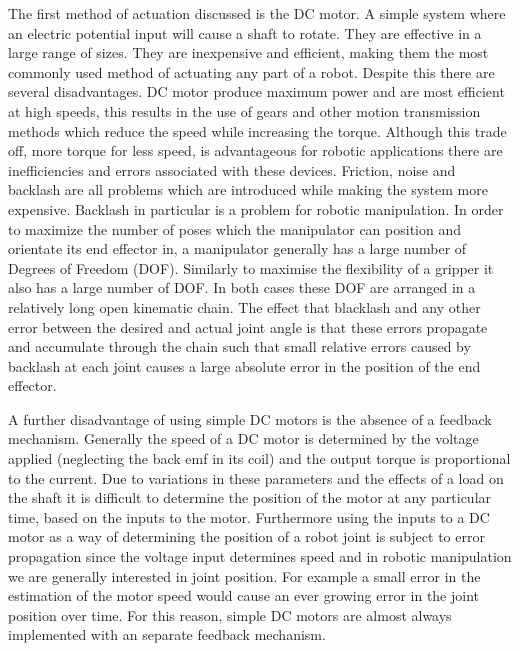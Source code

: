 The first method of actuation discussed is the DC motor. A simple system where an electric potential input will cause a shaft to rotate. They are effective in a large range of sizes. They are inexpensive and efficient, making them the most commonly used method of actuating any part of a robot. Despite this there are several disadvantages. DC motor produce maximum power and are most efficient at high speeds, this results in the use of gears and other motion transmission methods which reduce the speed while increasing the torque. Although this trade off, more torque for less speed, is advantageous for robotic applications there are inefficiencies and errors associated with these devices. Friction, noise and backlash are all problems which are introduced while making the system more expensive. Backlash in particular is a problem for robotic manipulation. In order to maximize the number of poses which the manipulator can position and orientate its end effector in, a manipulator generally has a large number of Degrees of Freedom (DOF). Similarly to maximise the flexibility of a gripper it also has a large number of DOF. In both cases these DOF are arranged in a relatively long open kinematic chain. The effect that blacklash and any other error between the desired and actual joint angle is that these errors propagate and accumulate through the chain such that small relative errors caused by backlash at each joint causes a large absolute error in the position of the end effector.


A further disadvantage of using simple DC motors is the absence of a feedback mechanism. Generally the speed of a DC motor is determined by the voltage applied (neglecting the back emf in its coil) and the output torque is proportional to the current. Due to variations in these parameters and the effects of a load on the shaft it is difficult to determine the position of the motor at any particular time, based on the inputs to the motor. Furthermore using the inputs to a DC motor as a way of determining the position of a robot joint is subject to error propagation since the voltage input determines speed and in robotic manipulation we are generally interested in joint position. For example a small error in the estimation of the motor speed would cause an ever growing error in the joint position over time. For this reason, simple DC motors are almost always implemented with an separate feedback mechanism.

